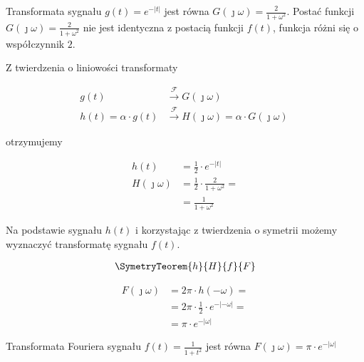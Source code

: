 \begin{task}
Transformata sygnału $g(t) = e^{-\left|t\right|}$ jest równa $G(\jmath \omega)=\frac{2}{1+\omega^2}$. Postać funkcji $G(\jmath \omega)=\frac{2}{1+\omega^2}$ nie jest identyczna z postacią funkcji $f(t)$, funkcja różni się o współczynnik $2$. 

Z twierdzenia o liniowości transformaty 

\begin{align*}
g(t) &\xrightarrow{\mathcal F} G(\jmath \omega)\\
h(t)=\alpha \cdot g(t) &\xrightarrow{\mathcal F} H(\jmath \omega) = \alpha \cdot G(\jmath \omega)\
\end{align*}

otrzymujemy

\begin{align*}
h(t) &= \frac{1}{2} \cdot e^{-\left|t\right|}\\
H(\jmath \omega)&=\frac{1}{2} \cdot \frac{2}{1+\omega^2}=\\
&=\frac{1}{1+\omega^2}
\end{align*}

Na podstawie sygnału $h(t)$ i korzystając z twierdzenia o symetrii możemy wyznaczyć transformatę sygnału $f(t)$.

\begin{align*}
\SymetryTeorem{h}{H}{f}{F}
\end{align*}

\begin{align*}
F(\jmath \omega)&=2\pi \cdot h(-\omega)=\\
&=2\pi \cdot \frac{1}{2} \cdot e^{-\left|-\omega\right|}=\\
&=\pi \cdot e^{-\left|\omega\right|}
\end{align*}

Transformata Fouriera sygnału $f(t)=\frac{1}{1+t^2}$ jest równa $F(\jmath \omega)=\pi \cdot e^{-\left|\omega\right|}$

\end{task}

